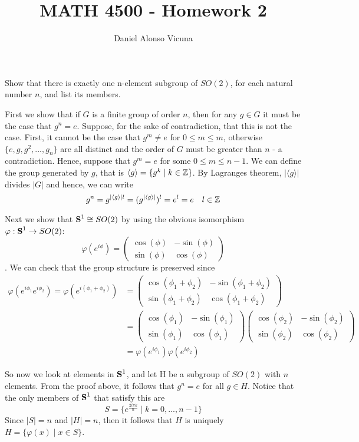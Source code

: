 \documentclass[11pt,onecolumn]{article}
\title{MATH 4500 - Homework 2}
\author{Daniel Alonso Vicuna}
\begin{document}
\maketitle

\begin{exercise}
Show that there is exactly one n-element subgroup of $SO(2)$, for each natural number $n$, and list its members. 
\end{exercise}
\begin{answer}

First we show that if $G$ is a finite group of order $n$, then for any $g \in G$ it must be the case that $g^n = e$. Suppose, for the sake of contradiction, that this is not the case. First, it cannot be the case that $g^m \neq e$ for $0 \leq m \leq m$, otherwise $\{e,g,g^2,...,g_n\}$ are all distinct and the order of $G$ must be greater than $n$ - a contradiction. Hence, suppose that $g^m = e$ for some $0 \leq m \leq n-1$. We can define the group generated by $g$, that is $\langle g \rangle = \{ g^k \mid k \in \operatorname{\mathbb{Z}}\}$. By Lagranges theorem, $|\langle g \rangle|$ divides $|G|$ and hence, we can write $$g^n = g^{|\langle g\rangle|l} = (g^{|\langle g\rangle|})^l = e^l = e \quad l \in \operatorname{\mathbb{Z}}$$

Next we show that $\operatorname{\mathbf{S}}^1 \cong SO(2)$ by using the obvious isomorphism $\varphi: \operatorname{\mathbf{S}}^1 \rightarrow SO(2)$:
$$ \varphi(e^{i\phi}) = \begin{pmatrix} \cos(\phi) & -\sin(\phi) \\ \sin(\phi) & \cos(\phi) \end{pmatrix} $$. We can check that the group structure is preserved since
\begin{align*}
\varphi(e^{i\phi_1}e^{i\phi_2}) = \varphi(e^{i(\phi_1+\phi_2)}) &=  \begin{pmatrix} \cos(\phi_1 + \phi_2) & -\sin(\phi_1 + \phi_2) \\ \sin(\phi_1 + \phi_2) & \cos(\phi_1 + \phi_2) \end{pmatrix} \\
&=\begin{pmatrix} \cos(\phi_1 ) & -\sin(\phi_1) \\ \sin(\phi_1) & \cos(\phi_1) \end{pmatrix} \begin{pmatrix} \cos(\phi_2) & -\sin(\phi_2) \\ \sin( \phi_2) & \cos( \phi_2) \end{pmatrix}\\
&= \varphi(e^{i\phi_1})\varphi(e^{i\phi_2})
\end{align*}

So now we look at elements in $\operatorname{\mathbf{S}}^1$, and let H be a subgroup of $SO(2)$ with $n$ elements. From the proof above, it follows that $g^n = e $ for all $g \in H$. Notice that the only members of $\operatorname{\mathbf{S}}^1$ that satisfy this are
$$S = \{ e^\frac{2i\pi k}{n} \mid k=0,...,n-1\}$$
Since $|S| = n$ and $|H|= n$, then it follows that $H$ is uniquely $H  = \{ \varphi(x) \mid x \in S\}$.


\end{answer}
\end{document}
